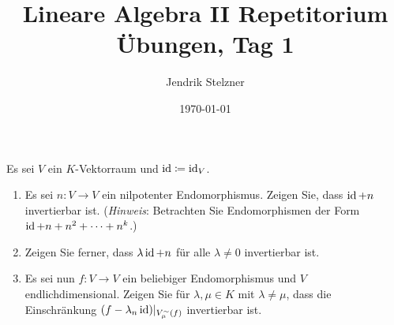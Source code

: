 \documentclass[a4paper, 10pt]{scrartcl}
\title{Lineare Algebra II Repetitorium \\ Übungen, Tag 1}
\author{Jendrik Stelzner}
\date{\today}
\begin{document}
\maketitle


\begin{question}
  Es sei $V$ ein $K$-Vektorraum und $\operatorname{id} \coloneqq \operatorname{id}_V$.
  \begin{enumerate}[leftmargin=*]
    \item
      Es sei $n \colon V \to V$ ein nilpotenter Endomorphismus.
      Zeigen Sie, dass $\operatorname{id} + n$ invertierbar ist.
      (\emph{Hinweis}: Betrachten Sie Endomorphismen der Form $\operatorname{id} + n + n^2 + \dotsb + n^k$.)
    \item
      Zeigen Sie ferner, dass $\lambda \operatorname{id} + n$ für alle $\lambda \neq 0$ invertierbar ist.
    \item
      Es sei nun $f \colon V \to V$ ein beliebiger Endomorphismus und $V$ endlichdimensional.
      Zeigen Sie für $\lambda, \mu \in K$ mit $\lambda \neq \mu$, dass die Einschränkung $(f - \lambda_n \operatorname{id})|_{V^\sim_\mu(f)}$ invertierbar ist.
  \end{enumerate}
\end{question}
\end{document}

